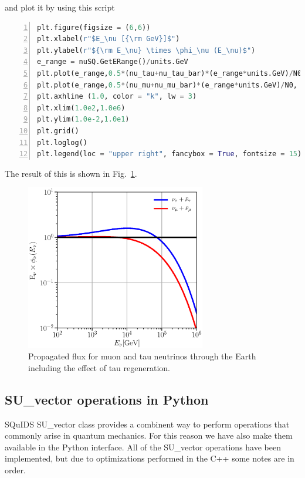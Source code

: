 \documentclass[3p,12pt]{elsarticle}
\newcommand{\ttf}{\ttfamily}
\begin{document}
and plot it by using this script

\begin{lstlisting}[language=Python, frame=leftline, numbers=left, breaklines=true]
plt.figure(figsize = (6,6))
plt.xlabel(r"$E_\nu [{\rm GeV}]$")
plt.ylabel(r"${\rm E_\nu} \times \phi_\nu (E_\nu)$")
e_range = nuSQ.GetERange()/units.GeV
plt.plot(e_range,0.5*(nu_tau+nu_tau_bar)*(e_range*units.GeV)/N0, lw = 3, label =r"$\nu_\tau + \bar{\nu}_\tau$", color = "blue")
plt.plot(e_range,0.5*(nu_mu+nu_mu_bar)*(e_range*units.GeV)/N0, lw = 3, label =r"$\nu_\mu + \bar{\nu}_\mu$", color = "red")
plt.axhline (1.0, color = "k", lw = 3)
plt.xlim(1.0e2,1.0e6)
plt.ylim(1.0e-2,1.0e1)
plt.grid()
plt.loglog()
plt.legend(loc = "upper right", fancybox = True, fontsize = 15)
\end{lstlisting}
The result of this is shown in Fig.~\ref{fig:nusquids_atm_python_with_interaction}.

\begin{figure}[h!]
  \label{fig:nusquids_atm_python_with_interaction}
  \centering
  \includegraphics[width=0.7\textwidth]{fig/nusquids_python_with_interactions_both.eps} 
  \caption{Propagated flux for muon and tau neutrinos through the Earth including the effect of tau regeneration.}
\end{figure}

\subsection{{\ttf SU\_vector} operations in Python~\label{sec:python_suvector}}

SQuIDS {\ttf SU\_vector} class provides a combinent way to perform operations
that commonly arise in quantum mechanics. For this reason we have also make them
available in the {\ttf Python} interface. All of the {\ttf SU\_vector} operations have been implemented,
but due to optimizations performed in the {\ttf C++} some notes are in order.
\end{document}
